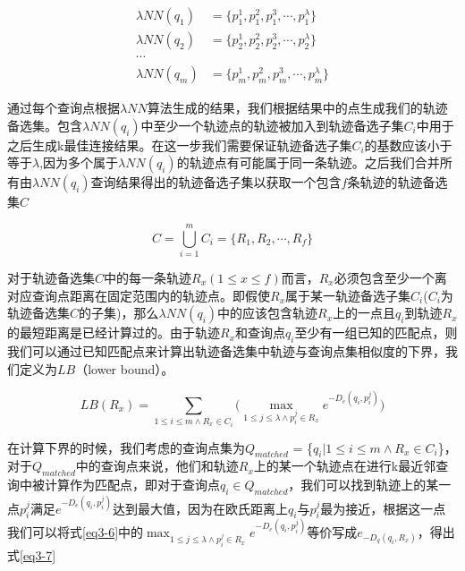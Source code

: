 \begin{align*}
\lambda NN(q_{1}) &= \{p_{1}^{1}, p_{1}^{2}, p_{1}^{3}, \cdots, p_{1}^{\lambda}\}\\ 
\lambda NN(q_{2}) &= \{p_{2}^{1}, p_{2}^{2}, p_{2}^{3}, \cdots, p_{2}^{\lambda}\}\\ 
\cdots\\
\lambda NN(q_{m}) &= \{p_{m}^{1}, p_{m}^{2}, p_{m}^{3}, \cdots, p_{m}^{\lambda}\}
\end{align*}

通过每个查询点根据$\lambda NN$算法生成的结果，我们根据结果中的点生成我们的轨迹备选集。包含$\lambda NN(q_{i})$中至少一个轨迹点的轨迹被加入到轨迹备选子集$C_{i}$中用于之后生成k最佳连接结果。在这一步我们需要保证轨迹备选子集$C_{i}$的基数应该小于等于$\lambda$,因为多个属于$\lambda NN(q_{i})$的轨迹点有可能属于同一条轨迹。之后我们合并所有由$\lambda NN(q_{i})$查询结果得出的轨迹备选子集以获取一个包含$f$条轨迹的轨迹备选集$C$

\begin{equation} 
 C = \bigcup_{i=1}^{m} C_{i} = \{R_{1}, R_{2}, \cdots, R_{f}\} \nonumber
\end{equation}  

对于轨迹备选集$C$中的每一条轨迹$R_{x} (1 \leq x \leq f)$而言，$R_{x}$必须包含至少一个离对应查询点距离在固定范围内的轨迹点。即假使$R_{x}$属于某一轨迹备选子集$C_{i}$($C_{i}$为轨迹备选集$C$的子集)，那么$\lambda NN(q_{i})$中的应该包含轨迹$R_{x}$上的一点且$q_{i}$到轨迹$R_{x}$的最短距离是已经计算过的。由于轨迹$R_{x}$和查询点$q_{i}$至少有一组已知的匹配点，则我们可以通过已知匹配点来计算出轨迹备选集中轨迹与查询点集相似度的下界，我们定义为$LB$（lower bound）。

\begin{equation}
	\label{eq3-6}
	LB(R_{x}) = \sum_{1\leq i\leq m \wedge R_{x}\in C_{i}}\bigg( \max_{1\leq j\leq \lambda \wedge p_{i}^{j}\in R_{x}}e^{-D_{e}(q_{i}, p_{i}^{j})}\bigg)
\end{equation}


在计算下界的时候，我们考虑的查询点集为$Q_{matched}$ = \{$q_{i} | 1\leq i\leq m \wedge R_{x} \in C_{i}$\}，对于$Q_{matched}$中的查询点来说，他们和轨迹$R_{x}$上的某一个轨迹点在进行k最近邻查询中被计算作为匹配点，即对于查询点$q_{i} \in Q_{matched}$，我们可以找到轨迹上的某一点$p_{i}^{j}$满足$e^{-D_{e}(q_{i}, p_{i}^{j})}$达到最大值，因为在欧氏距离上$q_{i}$与$p_{i}^{j}$最为接近，根据这一点我们可以将式\ref{eq3-6}中的$\max_{1\leq j\leq \lambda \wedge p_{i}^{j}\in R_{x}}e^{-D_{e}(q_{i}, p_{i}^{j})}$等价写成$e_{-D_{q}(q_{i}, R_{x})}$，得出式\ref{eq3-7}

